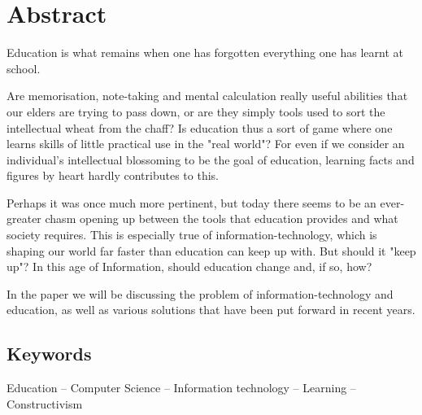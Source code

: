 
\chapter*{Abstract}\label{abstract}

\begin{coolquote}
Education is what remains when one has forgotten everything one has learnt at school.
\end{coolquote}

Are memorisation, note-taking and mental calculation really useful abilities that our elders are trying to pass down, or are they simply tools used to sort the intellectual wheat from the chaff? Is education thus a sort of game where one learns skills of little practical use in the "real world"? For even if we consider an individual's intellectual blossoming to be the goal of education, learning facts and figures by heart hardly contributes to this.

Perhaps it was once much more pertinent, but today there seems to be an ever-greater chasm opening up between the tools that education provides and what society requires. This is especially true of information-technology, which is shaping our world far faster than education can keep up with. But should it "keep up"? In this age of Information, should education change and, if so, how?

In the paper we will be discussing the problem of information-technology and education, as well as various solutions that have been put forward in recent years.

\vfill
\section*{Keywords}
Education -- Computer Science -- Information technology  -- Learning -- Constructivism